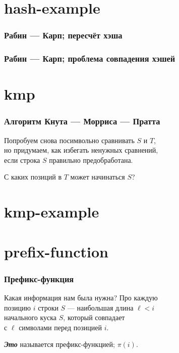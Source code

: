 \documentclass[11pt,aspectratio=169,svgnames]{beamer}
\begin{document}
\section{hash-example}

\begin{frame} \frametitle{Рабин — Карп; пересчёт хэша}
  \begin{center} \begin{tikzpicture}[xscale=0.71,yscale=0.87]
    
  \end{tikzpicture} \end{center}
\end{frame}


\begin{frame} \frametitle{Рабин — Карп; проблема совпадения хэшей}
  \begin{center} \begin{tikzpicture}[xscale=0.71,yscale=0.87]
    
  \end{tikzpicture} \end{center}
\end{frame}


\section{kmp}

\begin{frame} \frametitle{Алгоритм Кнута — Морриса — Пратта}
Попробуем снова посимвольно сравнивать \(S\) и \(T\),\\
но придумаем, как избегать ненужных сравнений,\\
если строка \(S\) правильно предобработана.\bigskip \pause

С каких позиций в \(T\) может начинаться \(S\)?
\end{frame}


\section{kmp-example}




\section{prefix-function}

\begin{frame} \frametitle{Префикс-функция}
Какая информация нам была нужна? Про каждую\\
позицию \(i\) строки \(S\) — наибольшая длина \(\ell< i\)\\
начального куска \(S\), который совпадает\\
с \(\ell\) символами перед позицией \(i\). \bigskip

{\itshape\bfseries Это} называется префикс-функцией; \(π(i)\). \bigskip


\end{frame}
\end{document}
